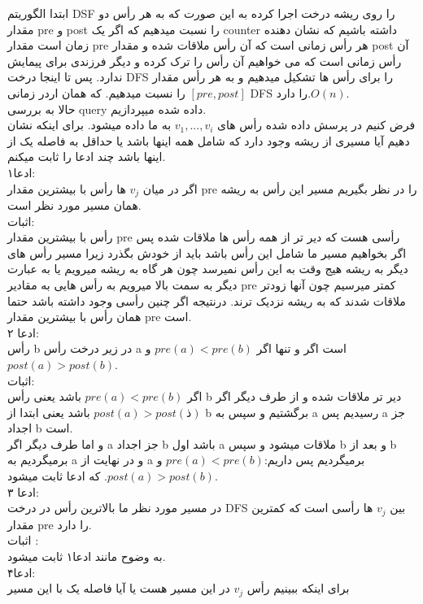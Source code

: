 \problem{}
ابتدا الگوریتم DSF را روی ریشه درخت اجرا کرده
به این صورت که به هر رأس دو مقدار pre و post را نسبت میدهیم
که اگر یک counter داشته باشیم که نشان دهنده زمان است
مقدار pre هر رأس زمانی است که آن رأس ملاقات شده
و مقدار post آن رأس زمانی است که 
می خواهیم آن رأس را ترک کرده و دیگر فرزندی برای پیمایش ندارد.
پس تا اینجا درخت DFS را برای رأس ها تشکیل میدهیم و 
به هر رأس مقدار $[pre , post]$ را نسبت میدهیم.
که همان اردر زمانی DFS را دارد.$ O(n)$.\\
حالا به بررسی query داده شده میپردازیم.\\
فرض کنیم در پرسش داده شده رأس های $v_1,...,v_i$
به ما داده میشود.
برای اینکه نشان دهیم آیا مسیری از ریشه وجود دارد که شامل همه اینها
باشد یا حداقل به فاصله یک از اینها باشد چند ادعا را ثابت میکنم.\\
ادعا۱:\\
اگر در میان $v_j$ ها رأس با بیشترین مقدار pre را در نظر بگیریم
مسیر این رأس به ریشه همان مسیر مورد نظر است.\\
اثبات:\\
رأس با بیشترین مقدار pre رأسی هست که دیر تر از همه رأس ها ملاقات شده
پس اگر بخواهیم مسیر ما شامل این رأس باشد باید از خودش بگذرد
زیرا مسیر رأس های دیگر به ریشه هیج وقت به این رأس نمیرسد چون هر گاه
 به ریشه میرویم یا به عبارت دیگر به سمت بالا میرویم به رأس هایی به مقادیر
 pre کمتر میرسیم چون آنها زودتر ملاقات شدند 
 که به ریشه نزدیک ترند. درنتیجه اگر چنین رأسی وجود داشته باشد
 حتما همان رأس با بیشترین مقدار pre است.\\
 ادعا ۲:\\
 رأس b در زیر درخت رأس a است اگر و تنها اگر $pre(a)<pre(b)$ و $post(a)>post(b)$.\\
 اثبات:\\
 اگر $pre(a)<pre(b)$ باشد یعنی
 رأس b دیر تر ملاقات شده و از طرف دیگر اگر
 $post(a)>post(ذ)$ باشد یعنی ابتدا از b برگشتیم و سپس به a رسیدیم
 پس a جز اجداد b است.
\\
و اما طرف دیگر اگر a جز اجداد b باشد اول a ملاقات میشود
و سپس b و بعد از b برمیگردیم به a و در نهایت از a برمیگردیم پس داریم:$pre(a)<pre(b)$ و $post(a)>post(b)$.
که ادعا ثابت میشود.\\
ادعا ۳:\\
در مسیر مورد نظر ما بالاترین رأس در درخت DFS بین $v_j$ ها رأسی است که کمترین مقدار
pre را دارد.\\
اثبات :\\
به وضوح مانند ادعا۱ ثابت میشود.\\
ادعا۴:\\
برای اینکه ببینیم رأس $v_j$ در این مسیر هست یا آیا فاصله یک با این مسیر
